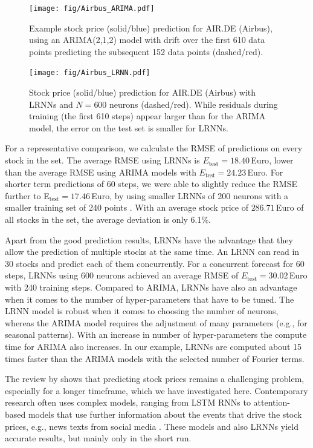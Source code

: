 \documentclass[twoside,11pt]{article}
\theoremstyle{definition}
\newcommand{\euro}{Euro}
\begin{document}
\begin{figure}
\begin{minipage}[t]{0.48\textwidth}
  \texttt{[image: fig/Airbus\_ARIMA.pdf]} %
  \caption{Example stock price (solid/blue) prediction for AIR.DE (Airbus), using an ARIMA(2,1,2)
	model with drift over the first 610 data points predicting the
	subsequent 152 data points (dashed/red).}
  \label{arima}
\end{minipage}
  \hfill%
\begin{minipage}[t]{0.48\textwidth}
  \texttt{[image: fig/Airbus\_LRNN.pdf]} %
  \caption{Stock price (solid/blue) prediction for AIR.DE (Airbus) with LRNNs and $N=600$ neurons (dashed/red).
	While residuals during training (the first 610 steps) appear larger than
	for the ARIMA model, the error on the test set is smaller for LRNNs.}
  \label{LRNN}
\end{minipage}
\end{figure}

For a representative comparison, we calculate the RMSE of predictions on every stock in the set.
The average RMSE using LRNNs is $E_\mathrm{test}=18.40${\,\euro}, lower than the  average
RMSE using ARIMA models with $E_\mathrm{test}=24.23${\,\euro}.
For shorter term predictions of 60 steps, we were able to slightly reduce the
RMSE further to E$_\mathrm{test}=17.46${\,\euro}, by using smaller LRNNs of 200
neurons with a smaller training set of 240 points \citep{Lit20}. With an average
stock price of $286.71${\,\euro} of all stocks in the set, the average deviation
is only 6.1\%.

Apart from the good prediction results, LRNNs have the advantage that they
allow the prediction of multiple stocks at the same time. An LRNN can read in 30
stocks and predict each of them concurrently. For a concurrent forecast for 60
steps, LRNNs using 600 neurons achieved an average RMSE of
$E_\mathrm{test}=30.02${\,\euro} with 240 training steps.
Compared to ARIMA, LRNNs have also an advantage when it comes to the number of
hyper-parameters that have to be tuned. The LRNN model is robust when it comes
to choosing the number of neurons, whereas the ARIMA model requires the
adjustment of many parameters (e.g., for seasonal patterns). With an increase in
number of hyper-parameters the compute time for ARIMA also increases. In our
example, LRNNs are computed about 15 times faster than the ARIMA models with the
selected number of Fourier terms.

The review by \citet{SIZ19} shows that predicting stock prices remains a
challenging problem, especially for a longer timeframe, which we have investigated
here. Contemporary research often uses complex models, ranging from LSTM RNNs
\citep{NPO17,RPV17} to attention-based models that use further information about
the events that drive the stock prices, e.g., news texts from social media
\citep{LL+19}. These models and also LRNNs yield accurate results, but mainly
only in the short run.
\end{document}
